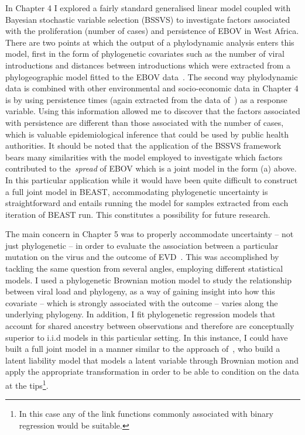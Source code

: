 In Chapter 4 I explored a fairly standard generalised linear model coupled with Bayesian stochastic variable selection (BSSVS) to investigate factors associated with the proliferation (number of cases) and persistence of EBOV in West Africa.
There are two points at which the output of a phylodynamic analysis enters this model, first in the form of phylogenetic covariates such as the number of viral introductions and distances between introductions which were extracted from a phylogeographic model fitted to the EBOV data~\citep{Dudas2017}.
The second way phylodynamic data is combined with other environmental and socio-economic data in Chapter 4 is by using persistence times (again extracted from the data of~\cite{Dudas2017}) as a response variable.
Using this information allowed me to discover that the factors associated with persistence are different than those associated with the number of cases, which is valuable epidemiological inference that could be used by public health authorities.
It should be noted that the application of the BSSVS framework bears many similarities with the model employed to investigate which factors contributed to the~\textit{spread} of EBOV which is a joint model in the form (a) above.
In this particular application while it would have been quite difficult to construct a full joint model in BEAST, accommodating phylogenetic uncertainty is straightforward and entails running the model for samples extracted from each iteration of BEAST run.
This constitutes a possibility for future research.

The main concern in Chapter 5 was to properly accommodate uncertainty -- not just phylogenetic -- in order to evaluate the association between a particular mutation on the virus and the outcome of EVD~\citep{Diehl2016}.
This was accomplished by tackling the same question from several angles, employing different statistical models.
I used a  phylogenetic Brownian motion model to study the relationship between viral load and phylogeny, as a way of gaining insight into how this covariate -- which is strongly associated with the outcome -- varies along the underlying phylogeny.
In addition, I fit phylogenetic regression models that account for shared ancestry between observations and therefore are conceptually superior to i.i.d models in this particular setting.
In this instance, I could have built a full joint model in a manner similar to the approach of~\cite{Cybis2015}, who build a latent liability model that models a latent variable through Brownian motion and apply the appropriate transformation in order to be able to condition on the data at the tips\footnote{In this case any of the link functions commonly associated with binary regression would be suitable.}.

